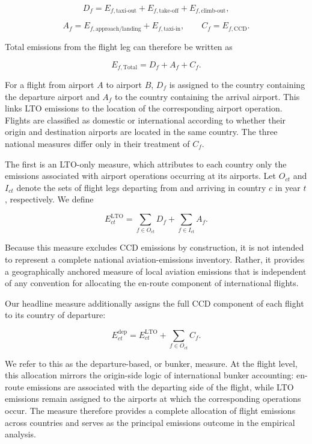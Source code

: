 \documentclass[12pt]{extarticle}
\begin{document}
\[
D_f
=
E_{f,\mathrm{taxi\mbox{-}out}}
+
E_{f,\mathrm{take\mbox{-}off}}
+
E_{f,\mathrm{climb\mbox{-}out}},
\]

\[
A_f
=
E_{f,\mathrm{approach/landing}}
+
E_{f,\mathrm{taxi\mbox{-}in}},
\qquad
C_f
=
E_{f,\mathrm{CCD}}.
\]

Total emissions from the flight leg can therefore be written as

\begin{equation}
E_{f,\mathrm{Total}}
=
D_f+A_f+C_f .
\label{eq:nature_4}
\end{equation}

For a flight from airport $A$ to airport $B$, $D_f$ is assigned to the country containing the departure airport and $A_f$ to the country containing the arrival airport. This links LTO emissions to the location of the corresponding airport operation. Flights are classified as domestic or international according to whether their origin and destination airports are located in the same country. The three national measures differ only in their treatment of $C_f$.

The first is an LTO-only measure, which attributes to each country only the emissions associated with airport operations occurring at its airports. Let $O_{ct}$ and $I_{ct}$ denote the sets of flight legs departing from and arriving in country $c$ in year $t$, respectively. We define

\begin{equation}
E^{\mathrm{LTO}}_{ct}
=
\sum_{f\in O_{ct}}D_f
+
\sum_{f\in I_{ct}}A_f .
\label{eq:nature_5}
\end{equation}

Because this measure excludes CCD emissions by construction, it is not intended to represent a complete national aviation-emissions inventory. Rather, it provides a geographically anchored measure of local aviation emissions that is independent of any convention for allocating the en-route component of international flights.

Our headline measure additionally assigns the full CCD component of each flight to its country of departure:

\begin{equation}
E^{\mathrm{dep}}_{ct}
=
E^{\mathrm{LTO}}_{ct}
+
\sum_{f\in O_{ct}} C_f .
\label{eq:nature_6}
\end{equation}

We refer to this as the departure-based, or bunker, measure. At the flight level, this allocation mirrors the origin-side logic of international bunker accounting: en-route emissions are associated with the departing side of the flight, while LTO emissions remain assigned to the airports at which the corresponding operations occur. The measure therefore provides a complete allocation of flight emissions across countries and serves as the principal emissions outcome in the empirical analysis.
\end{document}
